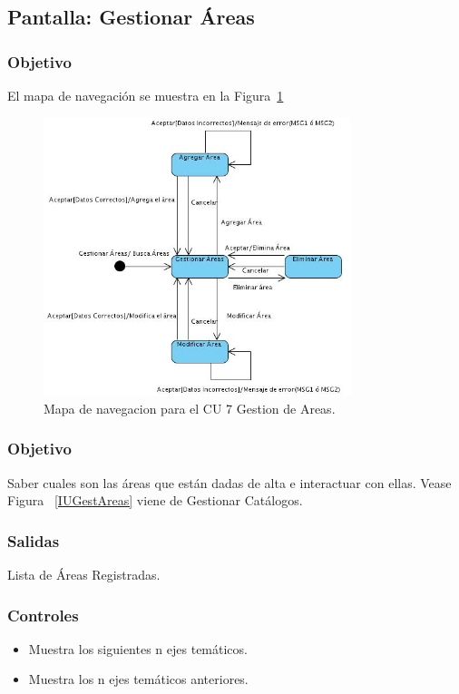 \subsection{Pantalla: Gestionar Áreas}
\subsubsection{Objetivo}
	El mapa de navegación se muestra en la Figura~\ref{fig:mapaNavegacionCU7}

   \begin{figure}[hbpt!]
 		\centering
 			\includegraphics[width=0.8\textwidth]{images/CU7/MapaNavegacion.jpg}
 		\caption{Mapa de navegacion para el CU 7 Gestion de Areas.}
		\label{fig:mapaNavegacionCU7}
 	\end{figure}

\subsubsection{Objetivo}
Saber cuales son las áreas que están dadas de alta e interactuar con ellas. Vease Figura ~\ref{IUGestAreas} viene de Gestionar Catálogos.


\subsubsection{Salidas}
Lista de Áreas Registradas.

\subsubsection{Controles}
\begin{itemize}
 \item {} Muestra los siguientes n ejes temáticos.
 \item {} Muestra los n ejes temáticos anteriores.
\end{itemize}
\newpage

